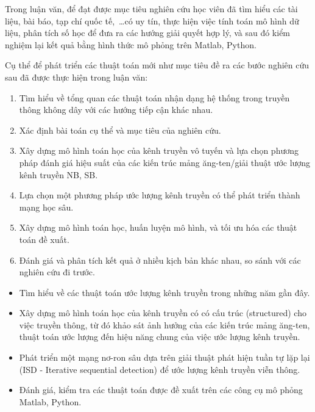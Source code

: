 
Trong luận văn, để đạt được mục tiêu nghiên cứu học viên đã tìm hiểu các tài liệu, bài báo, tạp chí quốc tế,~\ldots có uy tín, thực hiện việc tính toán mô hình dữ liệu, phân tích số học để đưa ra các hướng giải quyết hợp lý, và sau đó kiểm nghiệm lại kết quả bằng hình thức mô phỏng trên Matlab, Python.

Cụ thể để phát triển các thuật toán mới như mục tiêu đề ra các bước nghiên cứu sau đã được thực hiện trong luận văn:

\begin{enumerate}
    \item Tìm hiểu về tổng quan các thuật toán nhận dạng hệ thống trong truyền thông không dây với các hướng tiếp cận khác nhau. 
	\item Xác định bài toán cụ thể và mục tiêu của nghiên cứu.
    \item Xây dựng mô hình toán học của kênh truyền vô tuyến và lựa chọn phương pháp đánh giá hiệu suất của các kiến trúc mảng ăng-ten/giải thuật ước lượng kênh truyền NB, SB.
    \item Lựa chọn một phương pháp ước lượng kênh truyền có thể phát triển thành mạng học sâu.
	\item Xây dựng mô hình toán học, huấn luyện mô hình, và tối ưu hóa các thuật toán đề xuất.
	\item Đánh giá và phân tích kết quả ở nhiều kịch bản khác nhau, so sánh với các nghiên cứu đi trước.
\end{enumerate} 
\vspace{0.3cm}


\renewcommand{\labelitemi}{$-$}
\begin{itemize}
	\item Tìm hiểu về các thuật toán ước lượng kênh truyền trong những năm gần đây.
    \item Xây dựng mô hình toán học của kênh truyền có có cấu trúc (structured) cho việc truyền thông, từ đó khảo sát ảnh hưởng của các kiến trúc mảng ăng-ten, thuật toán ước lượng đến hiệu năng chung của việc ước lượng kênh truyền.
    
	\item Phát triển một mạng nơ-ron sâu dựa trên giải thuật phát hiện tuần tự lặp lại (ISD - Iterative sequential detection) để ước lượng kênh truyền viễn thông.
	
 \item Đánh giá, kiểm tra các thuật toán được đề xuất trên các công cụ mô phỏng Matlab, Python.
\end{itemize} 
\vspace{0.3cm}

